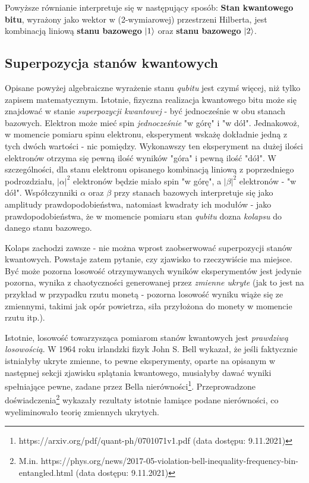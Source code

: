 \documentclass[12pt,a4paper,twoside,openany]{book}
\begin{document}
Powyższe równianie interpretuje się w następujący sposób: \textbf{Stan kwantowego bitu}, wyrażony jako wektor w (2-wymiarowej) przestrzeni Hilberta, jest kombinacją liniową \textbf{stanu bazowego} $\ket{1}$ oraz \textbf{stanu bazowego} $\ket{2}$.

\subsection{Superpozycja stanów kwantowych}

Opisane powyżej algebraiczne wyrażenie stanu \textit{qubitu} jest czymś więcej, niż tylko zapisem matematycznym. Istotnie, fizyczna realizacja kwantowego bitu może się znajdować w stanie \textit{superpozycji kwantowej} - być jednocześnie w obu stanach bazowych. Elektron może mieć spin \textit{jednocześnie} "w górę" i "w dół". Jednakowoż, w momencie pomiaru spinu elektronu, eksperyment wskażę dokładnie jedną z tych dwóch wartości - nic pomiędzy. Wykonawszy ten eksperyment na dużej ilości elektronów otrzyma się pewną ilość wyników "góra" i pewną ilość "dół". W szczególności, dla stanu elektronu opisanego kombinacją liniową z poprzedniego podrozdziału, $|\alpha|^2$ elektronów będzie miało spin "w górę", a $|\beta|^2$ elektronów - "w dół". Współczynniki $\alpha$ oraz $\beta$ przy stanach bazowych interpretuje się jako amplitudy prawdopodobieństwa, natomiast kwadraty ich modułów - jako prawdopodobieństwa, że w momencie pomiaru stan \textit{qubitu} dozna \textit{kolapsu} do danego stanu bazowego.

Kolaps zachodzi zawsze - nie można wprost zaobserwować superpozycji stanów kwantowych. Powstaje zatem pytanie, czy zjawisko to rzeczywiście ma miejsce. Być może pozorna losowość otrzymywanych wyników eksperymentów jest jedynie pozorna, wynika z chaotyczności generowanej przez \textit{zmienne ukryte} (jak to jest na przykład w przypadku rzutu monetą - pozorna losowość wyniku wiąże się ze zmiennymi, takimi jak opór powietrza, siła przyłożona do monety w momencie rzutu itp.). 

Istotnie, losowość towarzysząca pomiarom stanów kwantowych jest \textit{prawdziwą losowością}. W 1964 roku irlandzki fizyk John S. Bell wykazał, że jeśli faktycznie istniałyby ukryte zmienne, to pewne eksperymenty, oparte na opisanym w następnej sekcji zjawisku splątania kwantowego, musiałyby dawać wyniki spełniające pewne, zadane przez Bella nierówności\footnote{https://arxiv.org/pdf/quant-ph/0701071v1.pdf (data dostępu: 9.11.2021)}. Przeprowadzone doświadczenia\footnote{M.in. https://phys.org/news/2017-05-violation-bell-inequality-frequency-bin-entangled.html (data dostępu: 9.11.2021)} wykazały rezultaty istotnie łamiące podane nierówności, co wyeliminowało teorię zmiennych ukrytych.
\end{document}
